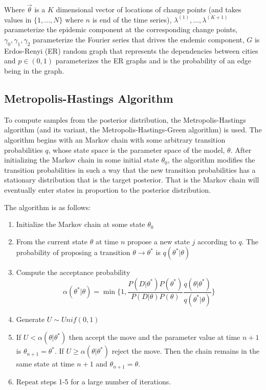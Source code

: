 \documentclass[11pt,a4paper]{article}
\numberwithin{equation}{section}
\begin{document}
Where \(\vec{\theta}\) is a \(K\) dimensional vector of locations of
change points (and takes values in \(\{1,\dots,N\}\) where \(n\) is end
of the time series), \(\lambda^{(1)}, \dots, \lambda^{(K+1)}\)
parameterize the epidemic component at the corresponding change points,
\(\gamma_0, \gamma_1, \gamma_2\) parameterize the Fourier series that
drives the endemic component, \(G\) is Erdos-Renyi (ER) random graph
that represents the dependencies between cities and \(p \in (0,1)\)
parameterizes the ER graphs and is the probability of an edge being in
the graph.

\hypertarget{metropolis-hastings-algorithm}{%
\subsection{Metropolis-Hastings
Algorithm}\label{metropolis-hastings-algorithm}}

To compute samples from the posterior distribution, the
Metropolis-Hastings algorithm (and its variant, the
Metropolis-Hastings-Green algorithm) is used. The algorithm begins with
an Markov chain with some arbitrary transition probabilities \(q\),
whose state space is the parameter space of the model, \(\theta\). After
initializing the Markov chain in some initial state \(\theta_0\), the
algorithm modifies the transition probabilities in such a way that the
new transition probabilities has a stationary distribution that is the
target posterior. That is the Markov chain will eventually enter states
in proportion to the posterior distribution.

The algorithm is as follows:

\begin{enumerate}
\def\labelenumi{\arabic{enumi}.}
\item
  Initialize the Markov chain at some state \(\theta_0\)
\item
  From the current state \(\theta\) at time \(n\) propose a new state
  \(j\) according to \(q\). The probability of proposing a transition
  \(\theta \rightarrow \theta^*\) is \(q(\theta^*|\theta)\)
\item
  Compute the acceptance probability
  \[\alpha(\theta^*|\theta) = \min\{1, \frac{P(D|\theta^*)P(\theta^*)}{P(D|\theta)P(\theta)}\frac{q(\theta|\theta^*)}{q(\theta^*|\theta)} \}\]
\item
  Generate \(U \sim Unif(0,1)\)
\item
  If \(U < \alpha(\theta|\theta^*)\) then accept the move and the
  parameter value at time \(n+1\) is \(\theta_{n+1} = \theta^*\). If
  \(U \geq \alpha(\theta|\theta^*)\) reject the move. Then the chain
  remains in the same state at time \(n+1\) and
  \(\theta_{n+1} = \theta\).
\item
  Repeat steps 1-5 for a large number of iterations.
\end{enumerate}
\end{document}
